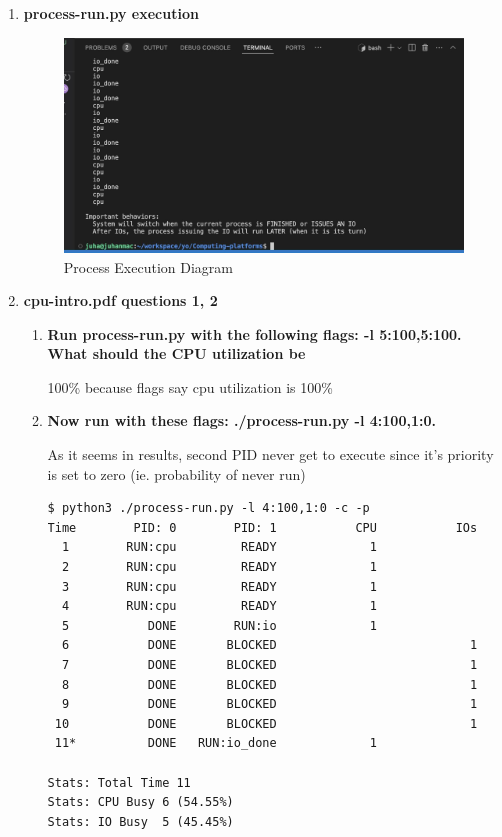 \documentclass{article}
\begin{document}
\begin{enumerate}[label=\textbf{\alph*})]
    \item \textbf{process-run.py execution}
    \begin{figure}[ht]
        \centering
        \includegraphics[width=\textwidth]{process-run-py.jpg}
        \caption{Process Execution Diagram}
        \label{fig:process-run-py}
    \end{figure}
    \item \textbf{cpu-intro.pdf questions 1, 2}

    \begin{enumerate}[label=\textbf{\arabic*}), start=1]
        \item
        {\bf Run process-run.py with the following flags:
        -l 5:100,5:100. What should the CPU utilization be}

        100\% because flags say cpu utilization is 100\%
        \item
        {\bf Now run with these flags: ./process-run.py
        -l 4:100,1:0.}

        As it seems in results, second PID never get to execute
        since it's priority is set to zero (ie. probability
        of never run)

        {\scriptsize
        \begin{verbatim}
$ python3 ./process-run.py -l 4:100,1:0 -c -p
Time        PID: 0        PID: 1           CPU           IOs
  1        RUN:cpu         READY             1          
  2        RUN:cpu         READY             1          
  3        RUN:cpu         READY             1          
  4        RUN:cpu         READY             1          
  5           DONE        RUN:io             1          
  6           DONE       BLOCKED                           1
  7           DONE       BLOCKED                           1
  8           DONE       BLOCKED                           1
  9           DONE       BLOCKED                           1
 10           DONE       BLOCKED                           1
 11*          DONE   RUN:io_done             1          

Stats: Total Time 11
Stats: CPU Busy 6 (54.55%)
Stats: IO Busy  5 (45.45%)
        \end{verbatim}
        }

    \end{enumerate}

\end{enumerate}
\newpage


\end{document}

